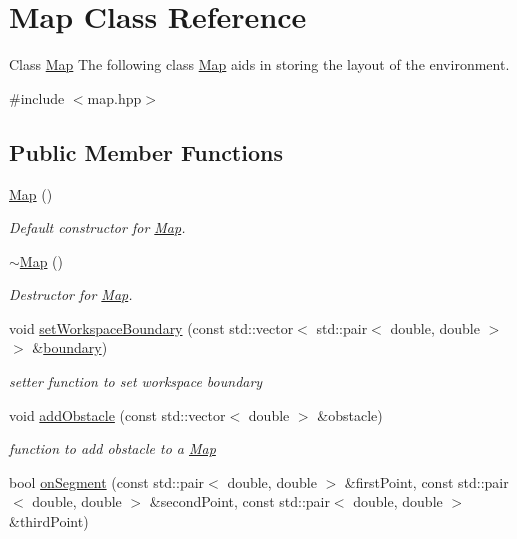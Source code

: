 \hypertarget{classMap}{}\section{Map Class Reference}
\label{classMap}


Class \hyperlink{classMap}{Map} The following class \hyperlink{classMap}{Map} aids in storing the layout of the environment.  




{\ttfamily \#include $<$map.\+hpp$>$}

\subsection*{Public Member Functions}
\begin{DoxyCompactItemize}
\item 
\hyperlink{classMap_a0f5ad0fd4563497b4214038cbca8b582}{Map} ()
\begin{DoxyCompactList}\small\item\em Default constructor for \hyperlink{classMap}{Map}. \end{DoxyCompactList}\item 
\hyperlink{classMap_aa403fbe09394ccf39747588f5168e3b2}{$\sim$\+Map} ()
\begin{DoxyCompactList}\small\item\em Destructor for \hyperlink{classMap}{Map}. \end{DoxyCompactList}\item 
void \hyperlink{classMap_a86751846501ae330d05846a326d3e27b}{set\+Workspace\+Boundary} (const std\+::vector$<$ std\+::pair$<$ double, double $>$$>$ \&\hyperlink{MapTest_8cpp_ad2559d9d65caf07bc831e905bc151444}{boundary})
\begin{DoxyCompactList}\small\item\em setter function to set workspace boundary \end{DoxyCompactList}\item 
void \hyperlink{classMap_a0eba67299e0745bc6ef754634e79048d}{add\+Obstacle} (const std\+::vector$<$ double $>$ \&obstacle)
\begin{DoxyCompactList}\small\item\em function to add obstacle to a \hyperlink{classMap}{Map} \end{DoxyCompactList}\item 
bool \hyperlink{classMap_abf3c57ffaaee4b5c69a4db9cbae65f21}{on\+Segment} (const std\+::pair$<$ double, double $>$ \&first\+Point, const std\+::pair$<$ double, double $>$ \&second\+Point, const std\+::pair$<$ double, double $>$ \&third\+Point)
$$
\end{DoxyCompactItemize}
